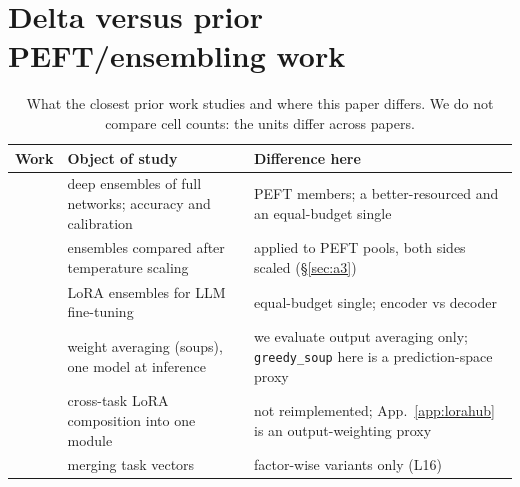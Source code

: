 \documentclass[11pt]{article}
\begin{document}
\section{Delta versus prior PEFT/ensembling work}\label{app:delta}
\begin{table}[h]
\centering
\caption{What the closest prior work studies and where this paper differs. We do not compare cell counts: the units differ across papers.}
\label{tab:delta}
\small
\setlength{\tabcolsep}{3pt}
\begin{tabular}{@{}>{\raggedright\arraybackslash}p{1.9cm}>{\raggedright\arraybackslash}p{2.6cm}>{\raggedright\arraybackslash}p{2.6cm}@{}}
\toprule
Work & Object of study & Difference here \\
\midrule
\citet{lakshminarayanan2017simple} & deep ensembles of full networks; accuracy and calibration & PEFT members; a better-resourced and an equal-budget single \\
\citet{ashukha2020pitfalls} & ensembles compared after temperature scaling & applied to PEFT pools, both sides scaled (\S\ref{sec:a3}) \\
\citet{wang2023loraensembles} & LoRA ensembles for LLM fine-tuning & equal-budget single; encoder vs decoder \\
\citet{wortsman2022model} & weight averaging (soups), one model at inference & we evaluate output averaging only; \texttt{greedy\_soup} here is a prediction-space proxy \\
\citet{huang2023lorahub} & cross-task LoRA composition into one module & not reimplemented; App.~\ref{app:lorahub} is an output-weighting proxy \\
\citet{yadav2023ties,yu2024dare} & merging task vectors & factor-wise variants only (L16) \\
\bottomrule
\end{tabular}
\end{table}
\end{document}
